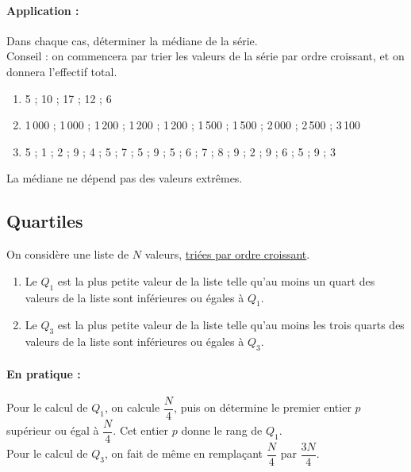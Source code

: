 \paragraph{Application :}Dans chaque cas, déterminer la médiane de la
  série.\\
  Conseil : on commencera par trier les valeurs de la série par ordre
  croissant, et on donnera l'effectif total.

\smallskip

\begin{enumerate}
\item 5 ; 10 ; 17 ; 12 ; 6 
\item 1\,000 ; 1\,000 ; 1\,200 ; 1\,200 ; 1\,200 ; 1\,500 ; 1\,500 ;
  2\,000 ; 2\,500 ; 3\,100 
\item 5 ; 1 ; 2 ; 9 ; 4 ; 5 ; 7 ; 5 ; 9 ; 5 ; 6 ; 7 ; 8 ; 9 ; 2 ; 9 ;
  6 ; 5 ; 9 ; 3 
\end{enumerate}

\begin{remark}
La médiane ne dépend pas des valeurs extrêmes.

    
\end{remark}



\bigskip


\subsection{Quartiles}

\begin{definition}
  On considère une liste de $N$ valeurs, \underline{triées par ordre
    croissant}. 
  \begin{enumerate}[\textbullet]
      \item Le  $Q_1$ est la plus petite valeur de
    la liste telle qu'au moins un quart des valeurs de la liste sont
    inférieures ou égales à $Q_1$.
\item Le  $Q_3$ est la plus petite valeur de
    la liste telle qu'au moins les trois quarts des valeurs de la
    liste sont inférieures ou égales à $Q_3$.
  \end{enumerate}

    
\end{definition}

\bigskip

\paragraph{En pratique :}
  Pour le calcul de $Q_1$, on calcule $\dfrac{N}4$, puis on détermine
  le premier entier $p$ supérieur ou égal à $\dfrac{N}4$. Cet entier
  $p$ donne le rang de $Q_1$. \\
  Pour le calcul de $Q_3$, on fait de même en remplaçant $\dfrac{N}4$
  par $\dfrac{3N}4$. 


